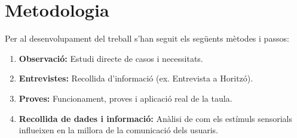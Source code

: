 \chapter{Metodologia}
Per al desenvolupament del treball s'han seguit els següents mètodes i passos:
\begin{enumerate}
    \item \textbf{Observació:} Estudi directe de casos i necessitats.
    \item \textbf{Entrevistes:} Recollida d'informació (ex. Entrevista a Horitzó).
    \item \textbf{Proves:} Funcionament, proves i aplicació real de la taula.
    \item \textbf{Recollida de dades i informació:} Anàlisi de com els estímuls sensorials influeixen en la millora de la comunicació dels usuaris.
\end{enumerate}
